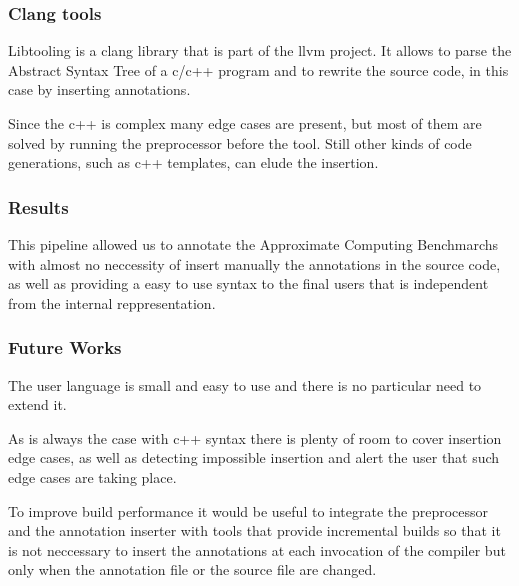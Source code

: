 \documentclass{beamer}
\begin{document}
\begin{frame}[fragile]
	\frametitle{Clang tools}
	\begin{block}{}
		Libtooling is a clang library that is part of the llvm project. It allows to parse the Abstract Syntax Tree of a c/c++ program and to rewrite the source code, in this case by inserting annotations. 
	\end{block}

	\begin{block}{}
		Since the c++ is complex many edge cases are present, but most of them are solved by running the preprocessor before the tool. Still other kinds of code generations, such as c++ templates, can elude the insertion.
	\end{block}
	

\end{frame}
\begin{frame}[fragile]
	\frametitle{Results}
	\begin{block}{}
		This pipeline allowed us to annotate the Approximate Computing Benchmarchs with almost no neccessity of insert manually the annotations in the source code, as well as providing a easy to use syntax to the final users that is independent from the internal reppresentation.
	\end{block}


\end{frame}
\begin{frame}[fragile]
	\frametitle{Future Works}
	\begin{block}{}
		The user language is small and easy to use and there is no particular need to extend it.
	\end{block}
	\begin{block}{}
		As is always the case with c++ syntax there is plenty of room to cover insertion edge cases, as well as detecting impossible insertion and alert the user that such edge cases are taking place.
	\end{block}
	\begin{block}{}
		To improve build performance it would be useful to integrate the preprocessor and the annotation inserter with tools that provide incremental builds so that it is not neccessary to insert the annotations at each invocation of the compiler but only when the annotation file or the source file are changed.
	\end{block}


\end{frame}
\end{document}
